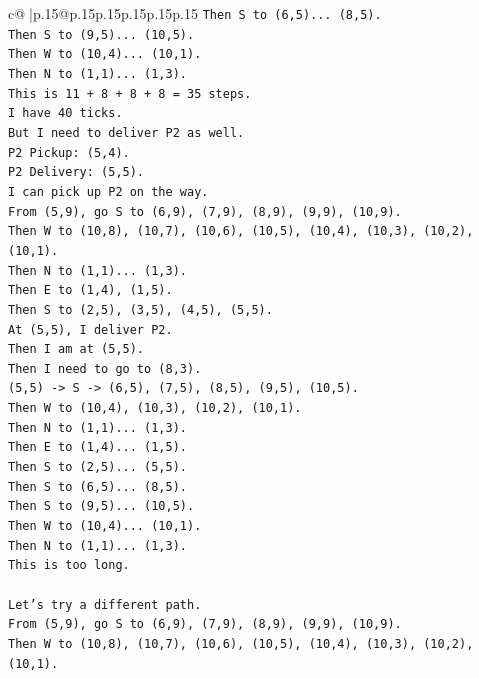 \documentclass{article}
\begin{document}
{\begin{supertabular}{c@{$\;$}|p{.15\linewidth}@{}p{.15\linewidth}p{.15\linewidth}p{.15\linewidth}p{.15\linewidth}p{.15\linewidth}}
{{{\texttt{Then S to (6,5)... (8,5).} \\
\texttt{Then S to (9,5)... (10,5).} \\
\texttt{Then W to (10,4)... (10,1).} \\
\texttt{Then N to (1,1)... (1,3).} \\
\texttt{This is 11 + 8 + 8 + 8 = 35 steps.} \\
\texttt{I have 40 ticks.} \\
\texttt{But I need to deliver P2 as well.} \\
\texttt{P2 Pickup: (5,4).} \\
\texttt{P2 Delivery: (5,5).} \\
\texttt{I can pick up P2 on the way.} \\
\texttt{From (5,9), go S to (6,9), (7,9), (8,9), (9,9), (10,9).} \\
\texttt{Then W to (10,8), (10,7), (10,6), (10,5), (10,4), (10,3), (10,2), (10,1).} \\
\texttt{Then N to (1,1)... (1,3).} \\
\texttt{Then E to (1,4), (1,5).} \\
\texttt{Then S to (2,5), (3,5), (4,5), (5,5).} \\
\texttt{At (5,5), I deliver P2.} \\
\texttt{Then I am at (5,5).} \\
\texttt{Then I need to go to (8,3).} \\
\texttt{(5,5) {-}> S {-}> (6,5), (7,5), (8,5), (9,5), (10,5).} \\
\texttt{Then W to (10,4), (10,3), (10,2), (10,1).} \\
\texttt{Then N to (1,1)... (1,3).} \\
\texttt{Then E to (1,4)... (1,5).} \\
\texttt{Then S to (2,5)... (5,5).} \\
\texttt{Then S to (6,5)... (8,5).} \\
\texttt{Then S to (9,5)... (10,5).} \\
\texttt{Then W to (10,4)... (10,1).} \\
\texttt{Then N to (1,1)... (1,3).} \\
\texttt{This is too long.} \\
\\ 
\texttt{Let's try a different path.} \\
\texttt{From (5,9), go S to (6,9), (7,9), (8,9), (9,9), (10,9).} \\
\texttt{Then W to (10,8), (10,7), (10,6), (10,5), (10,4), (10,3), (10,2), (10,1).} \\
}}}
\end{supertabular}}
\end{document}
